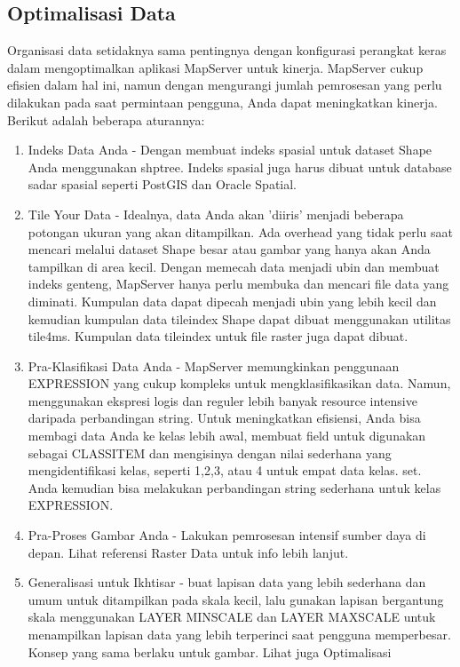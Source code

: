 \subsection{Optimalisasi Data}
Organisasi data setidaknya sama pentingnya dengan konfigurasi perangkat keras dalam mengoptimalkan aplikasi MapServer untuk kinerja. MapServer cukup efisien dalam hal ini, namun dengan mengurangi jumlah pemrosesan yang perlu dilakukan pada saat permintaan pengguna, Anda dapat meningkatkan kinerja. Berikut adalah beberapa aturannya:
\begin{enumerate}
\item Indeks Data Anda - Dengan membuat indeks spasial untuk dataset Shape Anda menggunakan shptree. Indeks spasial juga harus dibuat untuk database sadar spasial seperti PostGIS dan Oracle Spatial.

\item Tile Your Data - Idealnya, data Anda akan 'diiris' menjadi beberapa potongan ukuran yang akan ditampilkan. Ada overhead yang tidak perlu saat mencari melalui dataset Shape besar atau gambar yang hanya akan Anda tampilkan di area kecil. Dengan memecah data menjadi ubin dan membuat indeks genteng, MapServer hanya perlu membuka dan mencari file data yang diminati. Kumpulan data dapat dipecah menjadi ubin yang lebih kecil dan kemudian kumpulan data tileindex Shape dapat dibuat menggunakan utilitas tile4ms. Kumpulan data tileindex untuk file raster juga dapat dibuat.

\item Pra-Klasifikasi Data Anda - MapServer memungkinkan penggunaan EXPRESSION yang cukup kompleks untuk mengklasifikasikan data. Namun, menggunakan ekspresi logis dan reguler lebih banyak resource intensive daripada perbandingan string. Untuk meningkatkan efisiensi, Anda bisa membagi data Anda ke kelas lebih awal, membuat field untuk digunakan sebagai CLASSITEM dan mengisinya dengan nilai sederhana yang mengidentifikasi kelas, seperti 1,2,3, atau 4 untuk empat data kelas. set. Anda kemudian bisa melakukan perbandingan string sederhana untuk kelas EXPRESSION.

\item Pra-Proses Gambar Anda - Lakukan pemrosesan intensif sumber daya di depan. Lihat referensi Raster Data untuk info lebih lanjut.

\item Generalisasi untuk Ikhtisar - buat lapisan data yang lebih sederhana dan umum untuk ditampilkan pada skala kecil, lalu gunakan lapisan bergantung skala menggunakan LAYER MINSCALE dan LAYER MAXSCALE untuk menampilkan lapisan data yang lebih terperinci saat pengguna memperbesar. Konsep yang sama berlaku untuk gambar.
Lihat juga Optimalisasi
\end{enumerate}

